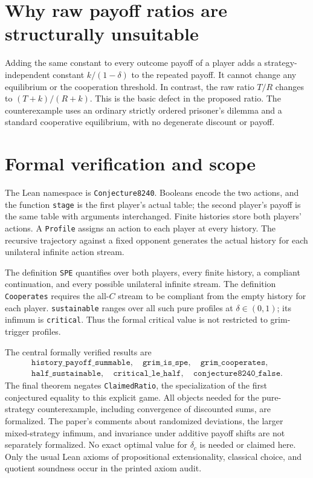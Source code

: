 \documentclass[11pt]{article}
\begin{document}
\section*{Why raw payoff ratios are structurally unsuitable}
Adding the same constant to every outcome payoff of a player adds a
strategy-independent constant $k/(1-\delta)$ to the repeated payoff.
It cannot change any equilibrium or the cooperation threshold. In
contrast, the raw ratio $T/R$ changes to $(T+k)/(R+k)$.
This is the basic defect in the proposed ratio. The counterexample
uses an ordinary strictly ordered prisoner's dilemma and a standard
cooperative equilibrium, with no degenerate discount or payoff.

\section*{Formal verification and scope}
The Lean namespace is \texttt{Conjecture8240}. Booleans encode the
two actions, and the function \texttt{stage} is the first player's
actual table; the second player's payoff is the same table with
arguments interchanged. Finite histories store both players' actions.
A \texttt{Profile} assigns an action to each player at every history.
The recursive trajectory against a fixed opponent generates the
actual history for each unilateral infinite action stream.

The definition \texttt{SPE} quantifies over both players, every finite
history, a compliant continuation, and every possible unilateral
infinite stream. The definition \texttt{Cooperates} requires the
all-$C$ stream to be compliant from the empty history for each player.
\texttt{sustainable} ranges over all such pure profiles at
$\delta\in(0,1)$; its infimum is \texttt{critical}. Thus the formal
critical value is not restricted to grim-trigger profiles.

The central formally verified results are
\[
\begin{gathered}
 \texttt{history\_payoff\_summable},\quad
 \texttt{grim\_is\_spe},\quad
 \texttt{grim\_cooperates},\\
 \texttt{half\_sustainable},\quad
 \texttt{critical\_le\_half},\quad
 \texttt{conjecture8240\_false}.
\end{gathered}
\]
The final theorem negates \texttt{ClaimedRatio}, the specialization
of the first conjectured equality to this explicit game.
All objects needed for the pure-strategy counterexample, including
convergence of discounted sums, are formalized. The paper's comments
about randomized deviations, the larger mixed-strategy infimum, and
invariance under additive payoff shifts are not separately formalized.
No exact optimal value for $\delta_c$ is needed or claimed here.
Only the usual Lean axioms of propositional extensionality, classical
choice, and quotient soundness occur in the printed axiom audit.
\end{document}
